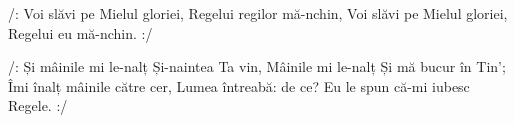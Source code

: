 \beginverse
/: Voi slăvi pe Mielul gloriei,
Regelui regilor mă-nchin,
Voi slăvi pe Mielul gloriei,
Regelui eu mă-nchin. :/
\endverse

\beginchorus
/: Și mâinile mi le-nalț
Și-naintea Ta vin,
Mâinile mi le-nalț
Și mă bucur în Tin’;
Îmi înalț mâinile către cer,
Lumea întreabă: de ce?
Eu le spun că-mi iubesc Regele. :/
\endchorus
\endsong